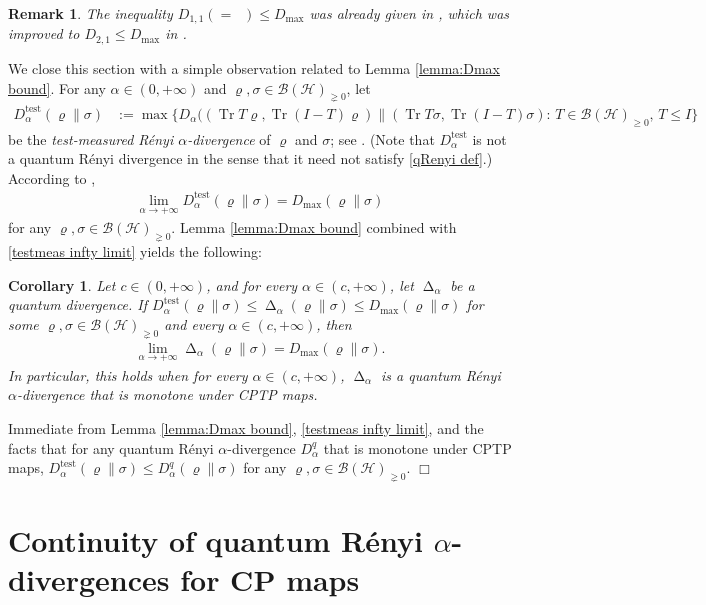 \documentclass[unsortedaddress,superscriptaddress,pra,notitlepage]{revtex4}
\newtheorem{rem}[definition]{Remark}
\newtheorem{cor}[definition]{Corollary}
\newenvironment{proof}[1][Proof]{\begin{trivlist}
\item[\hskip \labelsep {\bfseries #1}]}{\hfill$\Box$\end{trivlist}}
\def\B{{\mathcal B}}
\def\rho{\varrho}
\def\hil{{\mathcal H}}
\def\p{_{\ge 0}}
\def\pne{_{\gneq 0}}
\def\test{\mathrm{test}}
\newcommand{\ki}[1]{\textit{\textit{#1}}}
\DeclareMathOperator{\Tr}{Tr}
\DeclareMathOperator{\divv}{\Delta}
\DeclareMathOperator{\DU}{\mathit{D}^{Um}}
\begin{document}
\begin{rem}
The inequality $D_{1,1}(=\DU)\le D_{\max}$ was already given in 
\cite[Lemma 10]{Datta}, 
which was improved to $D_{2,1}\le D_{\max}$ in \cite[Lemma 7]{BuscemiDatta2010}.
\end{rem}

We close this section with a simple observation related to Lemma \ref{lemma:Dmax bound}.
For any $\alpha\in(0,+\infty)$ and $\rho,\sigma\in\B(\hil)\pne$, let 
\begin{align*}
D_{\alpha}^{\test}(\rho\|\sigma)&:=\max\{D_{\alpha}((\Tr T\rho,\Tr(I-T)\rho)\|(\Tr T\sigma,\Tr(I-T)\sigma):\,
T\in\B(\hil)\p,\,T\le I\}
\end{align*}
be the \ki{test-measured R\'enyi $\alpha$-divergence}
of $\rho$ and $\sigma$; see \cite{MH-testdiv}. (Note that $D_{\alpha}^{\test}$ is not a quantum R\'enyi divergence in the sense that it need not satisfy \eqref{qRenyi def}.)
According to \cite[Proposition III.32]{MH-testdiv}, 
\begin{align}\label{testmeas infty limit}
\lim_{\alpha\to+\infty}D_{\alpha}^{\test}(\rho\|\sigma)=D_{\max}(\rho\|\sigma)
\end{align}
for any $\rho,\sigma\in\B(\hil)\pne$.
Lemma \ref{lemma:Dmax bound} combined with \eqref{testmeas infty limit} yields  the following:

\begin{cor}
Let $c\in(0,+\infty)$, and for every $\alpha\in(c,+\infty)$, let $\divv_{\alpha}$ be a 
quantum divergence. If
$D_{\alpha}^{\test}(\rho\|\sigma)\le \divv_{\alpha}(\rho\|\sigma)\le D_{\max}(\rho\|\sigma)$
for some $\rho,\sigma\in\B(\hil)\pne$ and every $\alpha\in(c,+\infty)$, then 
\begin{align}\label{alpha infty limit}
\lim_{\alpha\to+\infty}\divv_{\alpha}(\rho\|\sigma)=D_{\max}(\rho\|\sigma).
\end{align}
In particular, this holds when for every $\alpha\in(c,+\infty)$, $\divv_{\alpha}$ is a quantum R\'enyi $\alpha$-divergence that is monotone under CPTP maps. 
\end{cor}
\begin{proof}
Immediate from Lemma \ref{lemma:Dmax bound}, \eqref{testmeas infty limit}, and the facts that 
for any quantum R\'enyi $\alpha$-divergence $D_{\alpha}^q$ that is monotone under CPTP maps, 
$D_{\alpha}^{\test}(\rho\|\sigma)\le D_{\alpha}^{q}(\rho\|\sigma)$
for any $\rho,\sigma\in\B(\hil)\pne$.
\end{proof}


\section{Continuity of quantum R\'enyi $\alpha$-divergences for CP maps}
\label{sec:chdiv cont}
\end{document}
